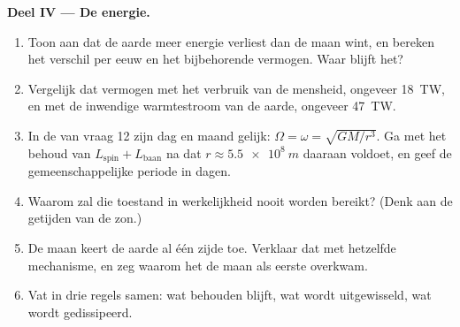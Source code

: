 \begin{problem}
\medskip
\noindent\textbf{Deel IV --- De energie.}
\begin{enumerate}[resume]
  \item Toon aan dat de aarde meer energie verliest dan de maan wint, en
        bereken het verschil per eeuw en het bijbehorende vermogen.
        Waar blijft het?
  \item Vergelijk dat vermogen met het verbruik van de mensheid, ongeveer
        \qty{18}{TW}, en met de inwendige warmtestroom van de aarde, ongeveer
        \qty{47}{TW}.
  \item In de  van vraag 12 zijn dag en maand gelijk:
        $\Omega = \omega = \sqrt{GM/r^3}$. Ga met het behoud van
        $L_{\text{spin}} + L_{\text{baan}}$ na dat $r \approx
        \qty{5.5e8}{m}$ daaraan voldoet, en geef de gemeenschappelijke periode in dagen.
  \item Waarom zal die toestand in werkelijkheid nooit worden bereikt? (Denk aan de
        getijden van de zon.)
  \item De maan keert de aarde al één zijde toe. Verklaar dat met hetzelfde
        mechanisme, en zeg waarom het de maan als eerste overkwam.
  \item Vat in drie regels samen: wat behouden blijft, wat wordt uitgewisseld,
        wat wordt gedissipeerd.
\end{enumerate}
\end{problem}
